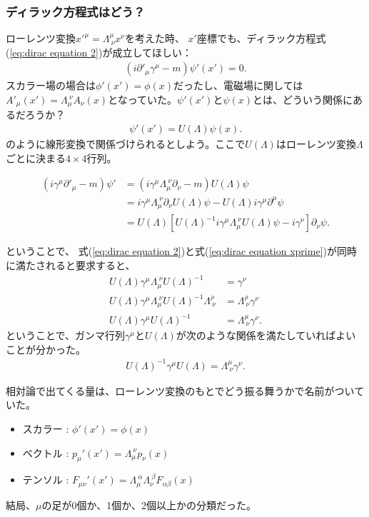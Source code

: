 \documentclass[10pt,a4paper]{jarticle}
\begin{document}
\subsubsection{ディラック方程式はどう？}
ローレンツ変換${x'}^\mu = \Lambda^\mu_{~\nu} x^\nu$を考えた時、
$x'$座標でも、ディラック方程式(\ref{eq:dirac equation 2})が成立してほしい：
\begin{align}
(i\partial'_\mu \gamma^\mu - m ) \psi'(x') = 0. \label{eq:dirac equation xprime}
\end{align}
スカラー場の場合は$\phi'(x') = \phi(x)$だったし、電磁場に関しては$A'_\mu(x') = \Lambda_\mu^{~\nu} A_\nu(x)$となっていた。$\psi'(x')$と$\psi(x)$とは、どういう関係にあるだろうか？
\begin{align}
\psi'(x') = U(\Lambda) \psi(x).
\end{align}
のように線形変換で関係づけられるとしよう。ここで$U(\Lambda)$はローレンツ変換$\Lambda$ごとに決まる$4\times 4$行列。

\begin{align}
(i\gamma^\mu \partial'_\mu - m ) \psi'
&=
(i\gamma^\mu \Lambda_\mu^{~\nu} \partial_\nu - m ) U(\Lambda) \psi \nonumber\\
&=
i\gamma^\mu \Lambda_\mu^{~\nu} \partial_\nu U(\Lambda) \psi
- U(\Lambda) i\gamma^\mu \partial^\mu \psi \nonumber\\
&=
U(\Lambda) [ U(\Lambda)^{-1} i\gamma^\mu \Lambda_\mu^{~\nu} U(\Lambda) \psi
- i\gamma^\nu ] \partial_\nu \psi.
\end{align}

ということで、
式(\ref{eq:dirac equation 2})と式(\ref{eq:dirac equation xprime})が同時に満たされると要求すると、
\begin{align}
U(\Lambda) \gamma^\mu \Lambda_\mu^{~\nu} U(\Lambda)^{-1} &= \gamma^\nu \nonumber\\
U(\Lambda) \gamma^\mu \Lambda_\mu^{~\nu} U(\Lambda)^{-1} \Lambda^\rho_{~\nu} &= \Lambda^\rho_{~\nu} \gamma^\nu \nonumber\\
U(\Lambda) \gamma^\mu U(\Lambda)^{-1} &= \Lambda^\mu_{~\nu} \gamma^\nu.
\end{align}
ということで、ガンマ行列$\gamma^\mu$と$U(\Lambda)$が次のような関係を満たしていればよいことが分かった。
\begin{align}
U(\Lambda)^{-1} \gamma^\mu U(\Lambda) = \Lambda^\mu_{~\nu} \gamma^\nu. \label{eq:dirac matrix lorentz inv}
\end{align}


相対論で出てくる量は、ローレンツ変換のもとでどう振る舞うかで名前がついていた。
\begin{itemize}
\item スカラー  : $\phi'(x') = \phi(x)$
\item ベクトル : $p_\mu'(x') = \Lambda_{\mu}^{~\nu} p_\nu(x)$
\item テンソル : $F_{\mu\nu}'(x') = \Lambda_{\mu}^{~\alpha} \Lambda_{\nu}^{~\beta} F_{\alpha\beta}(x)$
\end{itemize}
結局、$\mu$の足が0個か、1個か、2個以上かの分類だった。
\end{document}
